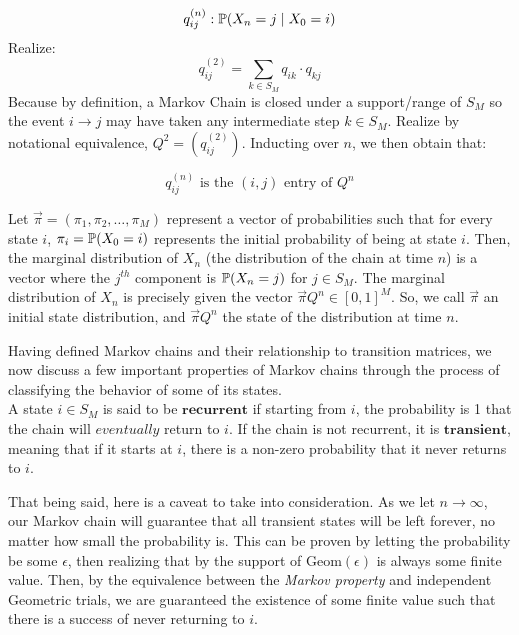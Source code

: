 $$ q_{ij}^{(n)}: \Prb(X_n = j \mid X_0 = i)$$
Realize:
$$q_{ij}^{(2)} = \sum_{k \in S_M} q_{ik}\cdot q_{kj}$$
Because by definition, a Markov Chain is closed under a support/range of $S_M$ so the event $i \to j$ may have taken any intermediate step $k \in S_M$. Realize by notational equivalence, $Q^2 = (q_{ij}^{(2)})$. Inducting over $n$, we then obtain that:

$$q_{ij}^{(n)} \text{ is the } (i,j) \text{ entry of } Q^n$$

\begin{definition}
Let $\vec{\pi} = (\pi_1,\pi_2,\dots,\pi_M)$ represent a vector of probabilities such that for every state $i$, $\pi_i = \Prb(X_0 = i)$ represents the initial probability of being at state $i$.
Then, the marginal distribution of $X_n$ (the distribution of the chain at time $n$) is a vector where the $j^{th}$ component is $\P(X_n = j)$ for $j \in S_M$.
The marginal distribution of $X_n$ is precisely given the vector $\vec{\pi} Q^n \in [0,1]^{M}$.
So, we call $\vec{\pi}$ an initial state distribution, and $\vec{\pi} Q^n$ the state of the distribution at time $n$.
\end{definition}

\newpage
{}

Having defined Markov chains and their relationship to transition matrices, we now discuss a few important properties of Markov chains through the process of classifying the behavior of some of its states. \\

 A state $i \in S_M$ is said to be $\textbf{recurrent}$ if starting from $i$, the probability is 1 that the chain will $\textit{eventually}$ return to $i$. If the chain is not recurrent, it is $\textbf{transient}$, meaning that if it starts at $i$, there is a non-zero probability that it never returns to $i$.

That being said, here is a caveat to take into consideration. As we let $n \to \infty$, our Markov chain will guarantee that all transient states will be left forever, no matter how small the probability is.
This can be proven by letting the probability be some $\epsilon$, then realizing that by the support of $\text{Geom}(\epsilon)$ is always some finite value.
Then, by the equivalence between the \textit{Markov property} and independent Geometric trials, we are guaranteed the existence of some finite value such that there is a success of never returning to $i$.

